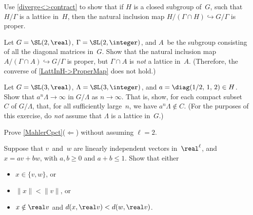 \begin{exercises}
\item \label{LattInH->ProperMap}
 Use \cref{diverge<>contract} to show that if
$H$ is a closed subgroup of~$G$, such that $H/\Gamma$
is a lattice in~$H$, then the natural inclusion map 
 $H/(\Gamma \cap H) \hookrightarrow G/\Gamma$ is proper.

\item Let $G = \SL(2,\real)$, $\Gamma = \SL(2,\integer)$,
and $A$~be the subgroup consisting of all the diagonal
matrices in~$G$. Show that the natural inclusion map 
 $A/(\Gamma \cap A) \hookrightarrow G/\Gamma$ is proper, but $\Gamma \cap A$ is \emph{not}
a lattice in~$A$. (Therefore, the converse of
\cref{LattInH->ProperMap} does not hold.)

\item Let $G = \SL(3,\real)$, $\Lambda = \SL(3,\integer)$, and $a = \diag(1/2, \, 1, \, 2)
 \in H$.
 Show that $a^n \Lambda \to \infty$ in $G/\Lambda$ 
 as $n \to \infty$. That is, show, for each compact
subset~$C$ of $G/\Lambda$, that, for all
sufficiently large~$n$, we have $a^n \Lambda \notin C$.
(For the purposes of this exercise, do \emph{not} assume
that $\Lambda$ is a lattice in~$G$.)



\item \label{MahlerCpctPfExer}
 Prove \cref{MahlerCpct}($\Leftarrow$)  %
  without assuming $\ell = 2$.

\item \label{min->ConvHull}
 Suppose that $v$~and~$w$ are linearly independent vectors
in~$\real^\ell$, and $x = av + bw$, with $a,b \ge 0$
and $a+b \le 1$. Show that either
 \begin{itemize}
 \item $x \in \{v,w\}$, or
 \item $\|x\| < \|v\|$, or
 \item $x \notin \real v$ and $d(x,\real v) < d(w,\real v)$.
 \end{itemize}
 

\end{exercises}
